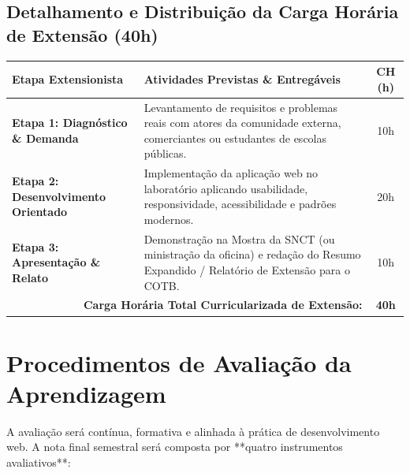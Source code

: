 \documentclass[12pt,a4paper]{article}
\begin{document}
\subsection{Detalhamento e Distribuição da Carga Horária de Extensão (40h)}

\begin{table}[H]
\centering
\small
\begin{tabularx}{\textwidth}{|l|X|c|}
\hline
\rowcolor{cinzaCabecalho}
\textbf{Etapa Extensionista} & \textbf{Atividades Previstas \& Entregáveis} & \textbf{CH (h)} \\ \hline
\rowcolor{cinzaLinha}
\textbf{Etapa 1: Diagnóstico \& Demanda} & Levantamento de requisitos e problemas reais com atores da comunidade externa, comerciantes ou estudantes de escolas públicas. & 10h \\ \hline
\textbf{Etapa 2: Desenvolvimento Orientado} & Implementação da aplicação web no laboratório aplicando usabilidade, responsividade, acessibilidade e padrões modernos. & 20h \\ \hline
\rowcolor{cinzaLinha}
\textbf{Etapa 3: Apresentação \& Relato} & Demonstração na Mostra da SNCT (ou ministração da oficina) e redação do Resumo Expandido / Relatório de Extensão para o COTB. & 10h \\ \hline
\multicolumn{2}{|r|}{\textbf{Carga Horária Total Curricularizada de Extensão:}} & \textbf{40h} \\ \hline
\end{tabularx}
\end{table}

\section{Procedimentos de Avaliação da Aprendizagem}

A avaliação será contínua, formativa e alinhada à prática de desenvolvimento web. A nota final semestral será composta por **quatro instrumentos avaliativos**:
\end{document}

